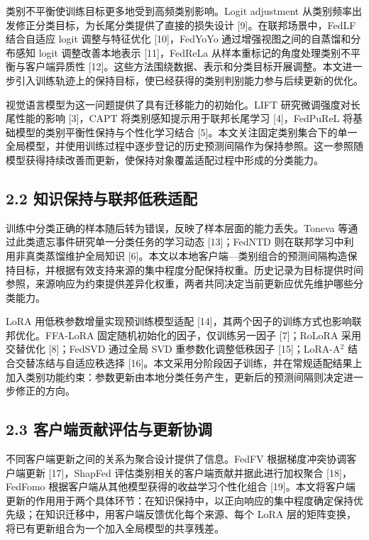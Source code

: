 \documentclass[UTF8,a4paper,10pt,fontset=fandol]{ctexart}
\begin{document}
类别不平衡使训练目标更多地受到高频类别影响。Logit adjustment 从类别频率出发修正分类目标，为长尾分类提供了直接的损失设计 [9]。在联邦场景中，FedLF 结合自适应 logit 调整与特征优化 [10]，FedYoYo 通过增强视图之间的自蒸馏和分布感知 logit 调整改善本地表示 [11]，FedReLa 从样本重标记的角度处理类别不平衡与客户端异质性 [12]。这些方法围绕数据、表示和分类目标开展调整。本文进一步引入训练轨迹上的保持目标，使已经获得的类别判别能力参与后续更新的优化。


视觉语言模型为这一问题提供了具有迁移能力的初始化。LIFT 研究微调强度对长尾性能的影响 [3]，CAPT 将类别感知提示用于联邦长尾学习 [4]，FedPuReL 将基础模型的类别平衡性保持与个性化学习结合 [5]。本文关注固定类别集合下的单一全局模型，并使用训练过程中逐步登记的历史预测间隔作为保持参照。这一参照随模型获得持续改善而更新，使保持对象覆盖适配过程中形成的分类能力。


\subsection*{2.2 知识保持与联邦低秩适配}

训练中分类正确的样本随后转为错误，反映了样本层面的能力丢失。Toneva 等通过此类遗忘事件研究单一分类任务的学习动态 [13]；FedNTD 则在联邦学习中利用非真类蒸馏维护全局知识 [6]。本文以本地客户端—类别组合的预测间隔构造保持目标，并根据有效支持来源的集中程度分配保持权重。历史记录为目标提供时间参照，来源响应为约束提供差异化权重，两者共同决定当前更新应优先维护哪些分类能力。


LoRA 用低秩参数增量实现预训练模型适配 [14]，其两个因子的训练方式也影响联邦优化。FFA-LoRA 固定随机初始化的因子，仅训练另一因子 [7]；RoLoRA 采用交替优化 [8]；FedSVD 通过全局 SVD 重参数化调整低秩因子 [15]；LoRA-A$^2$ 结合交替冻结与自适应秩选择 [16]。本文采用分阶段因子训练，并在常规适配结果上加入类别功能约束：参数更新由本地分类任务产生，更新后的预测间隔则决定进一步修正的方向。


\subsection*{2.3 客户端贡献评估与更新协调}

不同客户端更新之间的关系为聚合设计提供了信息。FedFV 根据梯度冲突协调客户端更新 [17]，ShapFed 评估类别相关的客户端贡献并据此进行加权聚合 [18]，FedFomo 根据客户端从其他模型获得的收益学习个性化组合 [19]。本文将客户端更新的作用用于两个具体环节：在知识保持中，以正向响应的集中程度确定保持优先级；在知识迁移中，用客户端反馈优化每个来源、每个 LoRA 层的矩阵变换，将已有更新组合为一个加入全局模型的共享残差。
\end{document}
